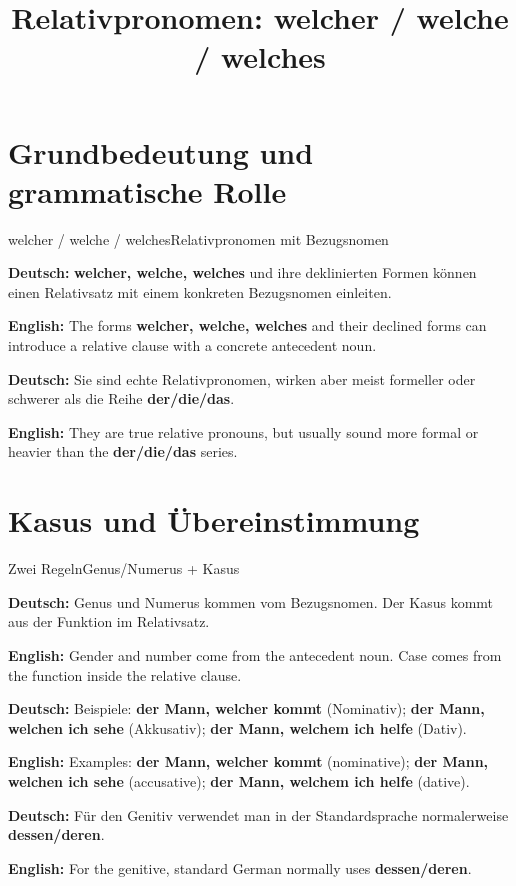 \documentclass[a4paper,11pt]{article}
\title{Relativpronomen: \glqq welcher / welche / welches\grqq{}}
\date{}
\newcommand{\GermanText}[1]{\textbf{Deutsch: }#1\par}
\newcommand{\EnglishText}[1]{{\small\color{SoftGray}\textbf{English: }#1\par}}
\begin{document}
\maketitle

\tableofcontents

\newpage

\section{Grundbedeutung und grammatische Rolle}

\begin{grammarentry}{welcher / welche / welches}{Relativpronomen mit Bezugsnomen}

\GermanText{\textbf{welcher, welche, welches} und ihre deklinierten Formen können einen Relativsatz mit einem konkreten Bezugsnomen einleiten.}

\EnglishText{The forms \textbf{welcher, welche, welches} and their declined forms can introduce a relative clause with a concrete antecedent noun.}

\GermanText{Sie sind echte Relativpronomen, wirken aber meist formeller oder schwerer als die Reihe \textbf{der/die/das}.}

\EnglishText{They are true relative pronouns, but usually sound more formal or heavier than the \textbf{der/die/das} series.}

\end{grammarentry}

\section{Kasus und Übereinstimmung}

\begin{grammarentry}{Zwei Regeln}{Genus/Numerus + Kasus}

\GermanText{Genus und Numerus kommen vom Bezugsnomen. Der Kasus kommt aus der Funktion im Relativsatz.}

\EnglishText{Gender and number come from the antecedent noun. Case comes from the function inside the relative clause.}

\GermanText{Beispiele: \textbf{der Mann, welcher kommt} (Nominativ); \textbf{der Mann, welchen ich sehe} (Akkusativ); \textbf{der Mann, welchem ich helfe} (Dativ).}

\EnglishText{Examples: \textbf{der Mann, welcher kommt} (nominative); \textbf{der Mann, welchen ich sehe} (accusative); \textbf{der Mann, welchem ich helfe} (dative).}

\GermanText{Für den Genitiv verwendet man in der Standardsprache normalerweise \textbf{dessen/deren}.}

\EnglishText{For the genitive, standard German normally uses \textbf{dessen/deren}.}

\end{grammarentry}
\end{document}
